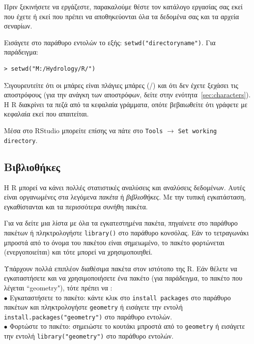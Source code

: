 \documentclass[a4paper,10pt,twocolumn]{article}
\begin{document}
Πριν ξεκινήσετε να εργάζεστε, παρακαλούμε θέστε τον κατάλογο εργασίας σας εκεί που έχετε ή εκεί που πρέπει
να αποθηκεύονται όλα τα δεδομένα σας και τα αρχεία σεναρίων.

Εισάγετε στο παράθυρο εντολών το εξής: \verb!setwd("directoryname")!. Για παράδειγμα:

\begin{Verbatim}[frame=single,gobble=0]
> setwd("M:/Hydrology/R/")
\end{Verbatim}

Σιγουρευτείτε ότι οι μπάρες είναι πλάγιες μπάρες (/) και ότι δεν έχετε ξεχάσει τις αποστρόφους (για την ανάγκη
των αποστρόφων, δείτε στην ενότητα~\ref{sec:characters}). Η R διακρίνει τα πεζά από τα κεφαλαία γράμματα, οπότε
βεβαιωθείτε ότι γράφετε με κεφαλαία εκεί που απαιτείται.

Μέσα στο RStudio μπορείτε επίσης να πάτε στο \texttt{Tools} $\rightarrow$ \texttt{Set working directory}.

\subsection{Βιβλιοθήκες} 

Η R μπορεί να κάνει πολλές στατιστικές αναλύσεις και αναλύσεις δεδομένων. Αυτές είναι οργανωμένες στα 
λεγόμενα \emph{πακέτα} ή \emph{βιβλιοθήκες}. Με την τυπική εγκατάσταση, εγκαθίστανται και τα περισσότερα
συνήθη πακέτα. 

Για να δείτε μια λίστα με όλα τα εγκατεστημένα πακέτα, πηγαίνετε στο παράθυρο πακέτων ή πληκτρολογήστε 
\verb!library()! στο παράθυρο κονσόλας. Εάν το τετραγωνάκι μπροστά από το όνομα του πακέτου είναι σημειωμένο,
το πακέτο φορτώνεται (ενεργοποιείται) και τότε μπορεί να χρησιμοποιηθεί. 

Υπάρχουν πολλά επιπλέον διαθέσιμα πακέτα στον ιστότοπο της R. Εάν θέλετε να εγκαταστήσετε και να χρησιμοποιήσετε
ένα πακέτο (για παράδειγμα, το πακέτο που λέγεται ``geometry"), τότε πρέπει να :\\
\noindent $\bullet$ Εγκαταστήσετε το πακέτο:  κάντε κλικ στο \texttt{install packages} στο παράθυρο πακέτων
και πληκτρολογήστε \texttt{geometry} ή εισάγετε την εντολή \verb!install.packages("geometry")! στο παράθυρο
εντολών.\\
\noindent $\bullet$ Φορτώστε το πακέτο: σημειώστε το κουτάκι μπροστά από το \texttt{geometry} ή εισάγετε
την εντολή \verb!library("geometry")! στο παράθυρο εντολών.
\end{document}

